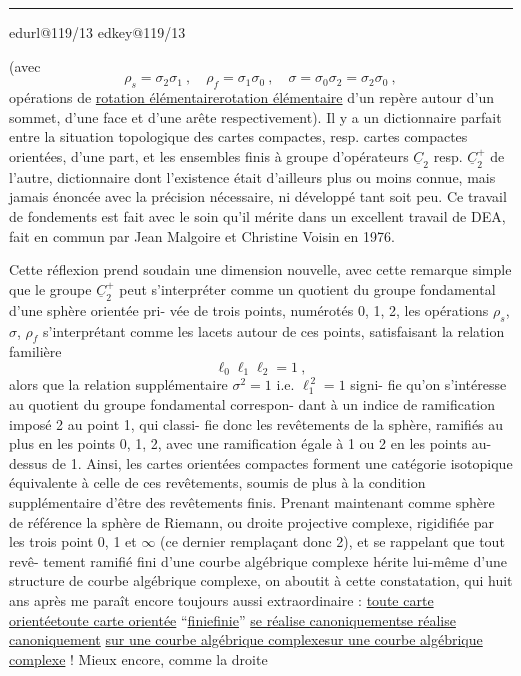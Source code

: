 \documentclass[11pt,a4paper]{article}
\makeatletter
\newif\ifreading
\newif\ifenglish
\def\CurrentScanURL{}
\def\CurrentPageKey{}
\def\CurrentApparatus{}
\newcommand{\scanpage}[1]{%
  \clearpage
  \expandafter\let\expandafter\CurrentScanURL\csname edurl@#1\endcsname
  \expandafter\let\expandafter\CurrentPageKey\csname edkey@#1\endcsname
  \def\CurrentApparatus{}%
  \hypertarget{scan-\CurrentPageKey}{}%
  \typeout{EDITION-SCAN: \CurrentPageKey; PDFPAGE: \the\numexpr\ReadonlyShipoutCounter+1\relax}%
  \ifreading
    \marginnote{\raggedright\scriptsize\sffamily\href{\CurrentScanURL}{119 / \csname edpage@#1\endcsname}}%
  \else
    \noindent{\small\sffamily\href{\CurrentScanURL}{[scan #1]}}\par\smallskip
  \fi}
\newcommand{\mspage}[1]{%
  \ifreading\marginnote{\raggedright\scriptsize\sffamily p.\,#1}[2\baselineskip]%
  \else\noindent{\small\sffamily[p.\,#1]}\par\smallskip\fi}
\let\TextUline\uline
\renewcommand{\uline}[1]{\ifmmode\underline{#1}\else\TextUline{#1}\fi}
\newcommand{\margin}[1]{%
  \sbox{\MarginalTestBox}{\parbox{\marginparwidth}{\raggedright\footnotesize#1}}%
  \ifdim\dimexpr\ht\MarginalTestBox+\dp\MarginalTestBox\relax>3\baselineskip
    \par\smallskip\noindent\begin{minipage}{\linewidth}\hrule\smallskip
    {\footnotesize\textcolor{HandInk}{\ifenglish Marginal note:\else Note marginale :\fi\ #1}}\smallskip\hrule\end{minipage}\par\smallskip
  \else
    \marginnote{\raggedright\footnotesize\textcolor{HandInk}{#1}}%
  \fi}
\newcommand{\finishscan}{\ifx\CurrentApparatus\empty\else\par\bigskip\noindent\rule{.35\linewidth}{.35pt}\par\smallskip{\footnotesize\setlength{\parskip}{3pt}\CurrentApparatus}\fi}
\makeatother
\begin{document}
\margin{12}

\finishscan
\scanpage{119/13}
\mspage{11}

(avec
\[ \rho_s = \sigma_2\sigma_1 \ , \quad \rho_f = \sigma_1\sigma_0 \ , \quad \sigma = \sigma_0\sigma_2 = \sigma_2\sigma_0 \ , \]
opérations de \uline{rotation élémentaire} d'un repère autour d'un sommet,
d'une face et d'une arête respectivement). Il y a un dictionnaire
parfait entre la situation topologique des cartes compactes, resp.
cartes compactes orientées, d'une part, et les ensembles finis à
groupe d'opérateurs $\underline{C}_2$ resp. $\underline{C}_2^+$ de l'autre, dictionnaire dont
l'existence était d'ailleurs plus ou moins connue, mais jamais
énoncée avec la précision nécessaire, ni développé tant soit peu.
Ce travail de fondements est fait avec le soin qu'il mérite dans
un excellent travail de DEA, fait en commun par Jean Malgoire et
Christine Voisin en 1976.

Cette réflexion prend soudain une dimension nouvelle,
avec cette remarque simple que le groupe $\underline{C}_2^+$ peut s'interpréter
comme un quotient du groupe fondamental d'une sphère orientée pri-
vée de trois points, numérotés 0, 1, 2, les opérations $\rho_s$, $\sigma$, $\rho_f$
s'interprétant comme les lacets autour de ces points, satisfaisant
la relation familière
\[ \ell_0\ell_1\ell_2 = 1 \ , \]
alors que la relation supplémentaire $\sigma^2 = 1$ i.e. $\ell_1^{\,2} = 1$ signi-%
fie qu'on s'intéresse au quotient du groupe fondamental correspon-%
dant à un indice de ramification imposé 2 au point 1, qui classi-%
fie donc les revêtements de la sphère, ramifiés au plus en les
points 0, 1, 2, avec une ramification égale à 1 ou 2 en les points
au-dessus de 1. Ainsi, les cartes orientées compactes forment une
catégorie isotopique équivalente à celle de ces revêtements, soumis
de plus à la condition supplémentaire d'être des revêtements finis.
Prenant maintenant comme sphère de référence la sphère de Riemann,
ou droite projective complexe, rigidifiée par les trois point 0, 1
et $\infty$ (ce dernier remplaçant donc 2), et se rappelant que tout revê-%
tement ramifié fini d'une courbe algébrique complexe hérite lui-même
d'une structure de courbe algébrique complexe, on aboutit à cette
constatation, qui huit ans après me paraît encore toujours aussi
extraordinaire : \uline{toute carte orientée} ``\uline{finie}'' \uline{se réalise canoniquement}
\uline{sur une courbe algébrique complexe} ! Mieux encore, comme la droite

\margin{13}
\end{document}
